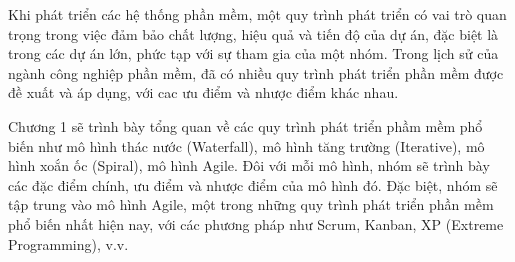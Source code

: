 \documentclass[../DoAn.tex]{subfiles}
\begin{document}
Khi phát triển các hệ thống phần mềm, một quy trình phát triển có vai trò quan trọng trong việc đảm bảo chất lượng, hiệu quả và tiến độ của dự án, đặc biệt là trong các dự án lớn, phức tạp với sự tham gia của một nhóm. Trong lịch sử của ngành công nghiệp phần mềm, đã có nhiều quy trình phát triển phần mềm được đề xuất và áp dụng, với cac ưu điểm và nhược điểm khác nhau.

Chương 1 sẽ trình bày tổng quan về các quy trình phát triển phầm mềm phổ biến như mô hình thác nước (Waterfall), mô hình tăng trường (Iterative), mô hình xoắn ốc (Spiral), mô hình Agile. Đôi với mỗi mô hình, nhóm sẽ trình bày các đặc điểm chính, ưu điểm và nhược điểm của mô hình đó. Đặc biệt, nhóm sẽ tập trung vào mô hình Agile, một trong những quy trình phát triển phần mềm phổ biến nhất hiện nay, với các phương pháp như Scrum, Kanban, XP (Extreme Programming), v.v.
\end{document}
